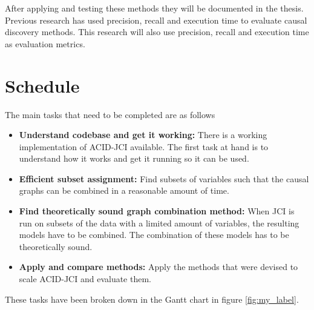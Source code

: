\documentclass[11pt]{article}
\begin{document}
After applying and testing these methods they will be documented in the thesis. Previous research has used precision, recall and execution time to evaluate causal discovery methods.\cite{jci,aci} This research will also use precision, recall and execution time as evaluation metrics.

\section{Schedule}
The main tasks that need to be completed are as follows

\begin{itemize}
    \item \textbf{Understand codebase and get it working:} There is a working implementation of ACID-JCI available. The first task at hand is to understand how it works and get it running so it can be used.
    \item \textbf{Efficient subset assignment:} Find subsets of variables such that the causal graphs can be combined in a reasonable amount of time.
    \item \textbf{Find theoretically sound graph combination method:} When JCI is run on subsets of the data with a limited amount of variables, the resulting models have to be combined. The combination of these models has to be theoretically sound.
    \item \textbf{Apply and compare methods:} Apply the methods that were devised to scale ACID-JCI and evaluate them.
\end{itemize}

These tasks have been broken down in the Gantt chart in figure \ref{fig:my_label}.
\end{document}
